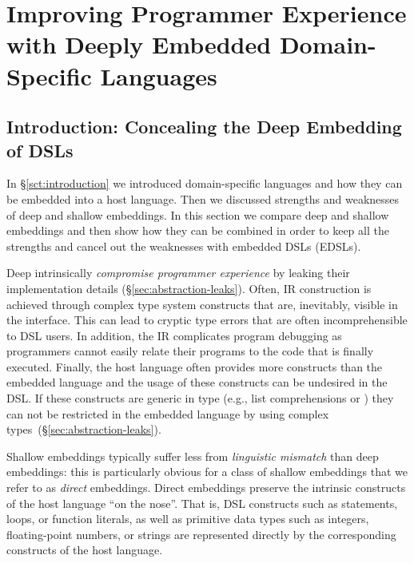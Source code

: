 \part{Improving Programmer Experience with Deeply Embedded Domain-Specific Languages}

\chapter{Introduction: Concealing the Deep Embedding of DSLs}
\label{sec:introduction-yy}
In \S \ref{sct:introduction} we introduced domain-specific languages and how they can
 be embedded into a host language. Then we discussed strengths and weaknesses of deep and shallow embeddings.
 In this section we compare deep and shallow embeddings and then show how they can
 be combined in order to keep all the strengths and cancel out the weaknesses with
 embedded DSLs (EDSLs).



Deep \edsls{} intrinsically \emph{compromise programmer experience} by leaking their
implementation details (\S \ref{sec:abstraction-leaks}). Often, IR construction
is achieved through complex type system constructs that are, inevitably,
visible in the \edsl interface. This can lead to cryptic type errors
that are often incomprehensible to DSL users.
In addition, the IR complicates program debugging as programmers cannot easily
relate their programs to the code that is finally executed. Finally, the host
language often provides more constructs than the embedded language and the usage
of these constructs can be undesired in the DSL. If these constructs are generic in type
(e.g., list comprehensions or ) they can not be restricted in the embedded
language by using complex types~(\S \ref{sec:abstraction-leaks}).


Shallow embeddings typically suffer less from \emph{linguistic mismatch} than deep embeddings:
 this is particularly obvious for a class of shallow embeddings that we refer to
 as \emph{direct} embeddings. Direct embeddings preserve the intrinsic constructs
 of the host language ``on the nose''. That is, DSL
 constructs such as  statements, loops, or function literals, as well
 as primitive data types such as integers, floating-point numbers, or strings
 are represented directly by the corresponding constructs of the host language.

